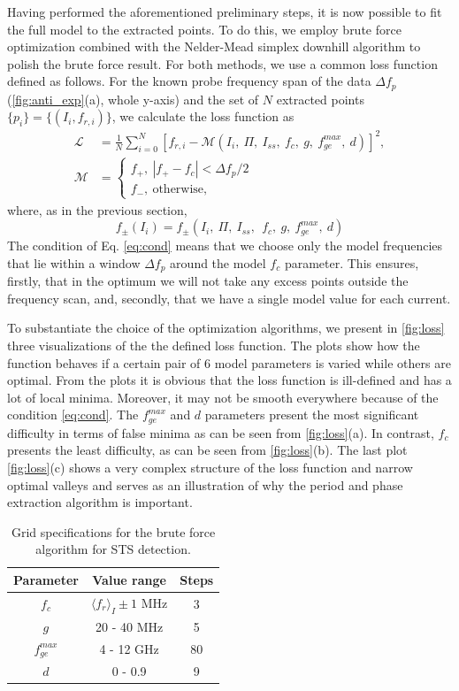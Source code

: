 \documentclass[%
 aip,
 amsmath,amssymb,
 reprint,%
]{revtex4-1}
\begin{document}
 
Having performed the aforementioned preliminary steps, it is now possible to fit the full model to the extracted points. To do this, we employ brute force optimization combined with the Nelder-Mead simplex downhill algorithm\cite{nelder1965} to polish the brute force result. For both methods, we use a common loss function defined as follows. For the known probe frequency span of the data $\Delta f_p$ (\autoref{fig:anti_exp}(a), whole y-axis) and the set of $N$ extracted points $\{p_i\} = \{(I_i, f_{r,i})\}$, we calculate the loss function as
\begin{align}
\mathcal{L} &= \frac{1}{N}\sum_{i=0}^N [f_{r,i} - \mathcal{M}(I_i,\ \Pi, \ I_{ss},\ f_c,\ g,\ f_{ge}^{max},\ d)]^2,\label{eq:loss}\\
\mathcal{M} &= \begin{cases}
f_+,\  |f_+ - f_c|< \Delta f_p/2 \\
f_-,\ \text{otherwise}, \label{eq:cond}
\end{cases}
\end{align}
where, as in the previous section, $$f_{\pm}(I_i) = f_{\pm}(I_i,\ \Pi,\ I_{ss},\ \ f_c,\ g,\ f_{ge}^{max},\ d)$$
The condition of Eq. \eqref{eq:cond} means that we choose only the model frequencies that lie within a window $\Delta f_p$ around the model $f_c$ parameter. This ensures, firstly, that in the optimum we will not take any excess points outside the frequency scan, and, secondly, that we have a single model value for each current.

To substantiate the choice of the optimization algorithms, we present in \autoref{fig:loss} three visualizations of the the defined loss function. The plots show how the function behaves if a certain pair of 6 model parameters is varied while others are optimal. From the plots it is obvious that the loss function is ill-defined and has a lot of local minima. Moreover, it may not be smooth everywhere because of the condition \eqref{eq:cond}. The $f^{max}_{ge}$ and $d$ parameters present the most significant difficulty in terms of false minima as can be seen from \autoref{fig:loss}(a). In contrast, $f_c$ presents the least difficulty, as can be seen from \autoref{fig:loss}(b). The last plot \autoref{fig:loss}(c) shows a very complex structure of the loss function and narrow optimal valleys and serves as an illustration of why the period and phase extraction algorithm is important.

\begin{table}
	\centering
	\begin{ruledtabular}
		\begin{tabular}{ccc} 
			Parameter & Value range & Steps \\ 
			\hline
			$f_c$ & $\langle f_r \rangle_{I} \pm 1$ MHz & 3\\ 
			$g$ & 20 - 40 MHz & 5\\
			$f_{ge}^{max}$ &  4 - 12 GHz & 80 \\
			$d$& 0 - 0.9 & 9
		\end{tabular} 
	\end{ruledtabular}
	\caption{Grid specifications for the brute force algorithm for STS detection.}
	\label{tab:grid}
\end{table}
\end{document}
